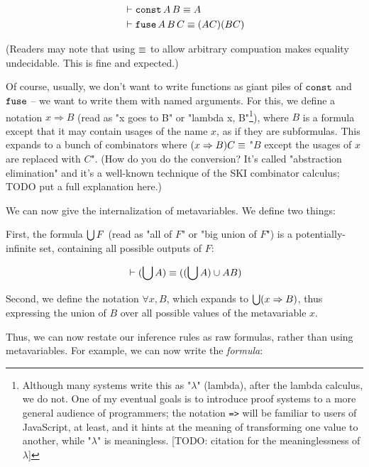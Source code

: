 \documentclass{article}
\begin{document}
  \begin{align*}
    &\vdash \operatorname{\texttt{const}} A\,B \equiv A\\
    &\vdash \operatorname{\texttt{fuse}} A\,B\,C \equiv (AC)(BC)\\
  \end{align*}
  
  (Readers may note that using $\equiv$ to allow arbitrary compuation makes equality undecidable. This is fine and expected.)

  \newcommand{\nameabst}[1]{#1 \Rightarrow}
  
  Of course, usually, we don't want to write functions as giant piles of $\operatorname{\texttt{const}}$ and $\operatorname{\texttt{fuse}}$ – we want to write them with named arguments. For this, we define a notation $\nameabst{x} B$ (read as "x goes to B" or "lambda x, B"\footnote{Although many systems write this as "$\lambda$" (lambda), after the lambda calculus, we do not. One of my eventual goals is to introduce proof systems to a more general audience of programmers; the notation \texttt{=>} will be familiar to users of JavaScript, at least, and it hints at the meaning of transforming one value to another, while "$\lambda$" is meaningless. [TODO: citation for the meaninglessness of $\lambda$]}), where $B$ is a formula except that it may contain usages of the name $x$, as if they are subformulas. This expands to a bunch of combinators where $(\nameabst{x} B) C \equals$ "$B$ except the usages of $x$ are replaced with $C$". (How do you do the conversion? It's called "abstraction elimination" and it's a well-known technique of the SKI combinator calculus; TODO put a full explanation here.)
  
  We can now give the internalization of metavariables. We define two things:
  
  First, the formula $\bigcup F$ (read as "all of $F$" or "big union of $F$") is a potentially-infinite set, containing all possible outputs of $F$:
  
  \begin{align*}
    &\vdash (\bigcup A) \equiv ((\bigcup A) \cup AB) \\
  \end{align*}
  
  Second, we define the notation $\forall x, B$, which expands to $\all (\nameabst{x} B)$, thus expressing the union of $B$ over all possible values of the metavariable $x$.
  
  Thus, we can now restate our inference rules as raw formulas, rather than using metavariables. For example, we can now write the \emph{formula}:
  
\end{document}

